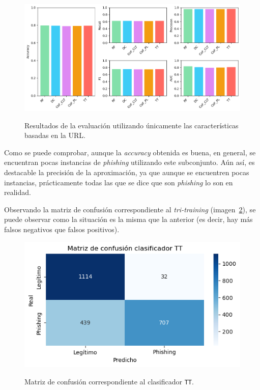 \begin{figure}[h]
	\caption[\textit{Phishing}: detección (\texttt{f1-f8})]{Resultados de la evaluación utilizando únicamente las características basadas en la URL.}
	\centering
	\includegraphics[width=\textwidth]{../img/memoria/5_phishing/f1f8_big}
	\label{gr:ph-f1f8_small}
\end{figure}

Como se puede comprobar, aunque la \textit{accuracy} obtenida es buena, en general, se encuentran pocas instancias de \textit{phishing} utilizando este subconjunto. Aún así, es destacable la precisión de la aproximación, ya que aunque se encuentren pocas instancias, prácticamente todas las que se dice que son \textit{phishing} lo son en realidad.

Observando la matriz de confusión correspondiente al \textit{tri-training} (imagen~\ref{gr:ph-f1f8_tt}), se puede observar como la situación es la misma que la anterior (es decir, hay más falsos negativos que falsos positivos).

\begin{figure}[h]
	\caption[\textit{Phishing}: detección (\texttt{f1-f8}, matriz de confusión \texttt{TT})]{Matriz de confusión correspondiente al clasificador \texttt{TT}.}
	\centering
	\includegraphics[scale=0.8]{../img/memoria/5_phishing/f1f8_tt}
	\label{gr:ph-f1f8_tt}
\end{figure}

